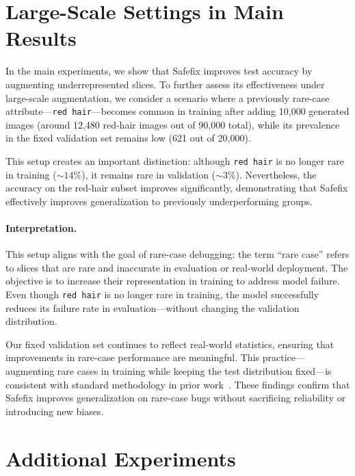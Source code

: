 \documentclass[10pt]{article} %
\newcommand{\model}{Safefix\xspace}
\begin{document}
\section{Large-Scale Settings in Main Results}
\label{sec:largescale}

In the main experiments,
 we show that \model improves test accuracy by augmenting underrepresented slices. To further assess its effectiveness under large-scale augmentation, we consider a scenario where a previously rare-case attribute—\texttt{red hair}—becomes common in training after adding 10{,}000 generated images (around 12{,}480 red-hair images out of 90{,}000 total), while its prevalence in the fixed validation set remains low (621 out of 20{,}000).

This setup creates an important distinction: although \texttt{red hair} is no longer rare in training (\(\sim14\%\)), it remains rare in validation (\(\sim3\%\)). Nevertheless, the accuracy on the red-hair subset improves significantly, demonstrating that \model effectively improves generalization to previously underperforming groups.

\paragraph{Interpretation.} This setup aligns with the goal of rare-case debugging: the term “rare case” refers to slices that are rare and inaccurate in evaluation or real-world deployment. The objective is to increase their representation in training to address model failure. Even though \texttt{red hair} is no longer rare in training, the model successfully reduces its failure rate in evaluation—without changing the validation distribution.

Our fixed validation set continues to reflect real-world statistics, ensuring that improvements in rare-case performance are meaningful. This practice—augmenting rare cases in training while keeping the test distribution fixed—is consistent with standard methodology in prior work~\citep{chen2023hibug}. These findings confirm that \model improves generalization on rare-case bugs without sacrificing reliability or introducing new biases.




\section{Additional Experiments}
\label{sec:additional-experiments}
\end{document}
